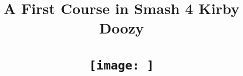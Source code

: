 \documentclass[12pt]{article}
\title{
	{A First Course in Smash 4 Kirby}
	\\	
	\vspace{1cm}
	\large
	{Doozy}\\
	\\
	\vspace{1cm}	
	{\texttt{[image: ]}}
	\\
	\vspace{2cm}	
	\normalsize
}
\begin{document}
\maketitle
\makeindex
\pagebreak
\tableofcontents








%

\end{document}
